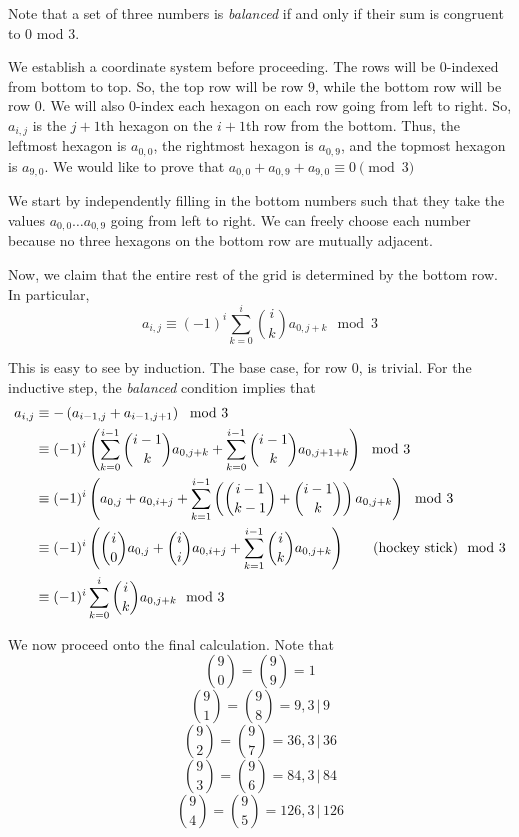 \documentclass[10pt]{../usamts}
\begin{document}
\begin{solution}
Note that a set of three numbers is \textit{balanced} if and only if their sum is congruent to 0 mod 3.

We establish a coordinate system before proceeding. The rows will be 0-indexed from bottom to top. So, the top row will be row 9, while the bottom row will be row 0. We will also 0-index each hexagon on each row going from left to right. So, $a_{i,j}$ is the $j+1$th hexagon on the $i+1$th row from the bottom. Thus, the leftmost hexagon is $a_{0,0}$, the rightmost hexagon is $a_{0,9}$, and the topmost hexagon is $a_{9,0}$. We would like to prove that $a_{0,0} + a_{0,9} + a_{9,0} \equiv 0 \pmod{3}$

We start by independently filling in the bottom numbers such that they take the values $a_{0,0} \dots a_{0,9}$ going from left to right. We can freely choose each number because no three hexagons on the bottom row are mutually adjacent.

Now, we claim that the entire rest of the grid is determined by the bottom row. In particular, $$a_{i,j} \equiv (-1)^{i} \sum_{k=0}^{i} \binom{i}{k} a_{0,j+k} \mod 3$$

This is easy to see by induction. The base case, for row 0, is trivial. For the inductive step, the \textit{balanced} condition implies that
\begin{align*}
    a_{i,j} &\equiv -\left( a_{i-1,j}+a_{i-1,j+1} \right) \mod 3\\
            &\equiv (-1)^{i} \left( \sum_{k=0}^{i-1} \binom{i-1}{k} a_{0,j+k} + \sum_{k=0}^{i-1} \binom{i-1}{k} a_{0,j+1+k} \right) \mod 3\\
            &\equiv (-1)^{i}\left( a_{0,j} + a_{0,i+j} + \sum_{k=1}^{i-1} \left( \binom{i-1}{k-1} + \binom{i-1}{k} \right) a_{0,j+k}  \right) \mod 3\\
            &\equiv (-1)^{i}\left( \binom{i}{0}a_{0,j} + \binom{i}{i}a_{0,i+j} + \sum_{k=1}^{i-1} \binom{i}{k} a_{0,j+k}  \right) \tag{hockey stick} \mod 3\\
            &\equiv (-1)^{i} \sum_{k=0}^{i} \binom{i}{k} a_{0,j+k} \mod 3\\
\end{align*}

We now proceed onto the final calculation. Note that
$$\binom{9}{0} = \binom{9}{9} = 1$$
$$\binom{9}{1} = \binom{9}{8} = 9, 3\,|\,9$$
$$\binom{9}{2} = \binom{9}{7} = 36, 3\,|\,36$$
$$\binom{9}{3} = \binom{9}{6} = 84, 3\,|\,84$$
$$\binom{9}{4} = \binom{9}{5} = 126, 3\,|\,126$$


\end{solution}
\end{document}
